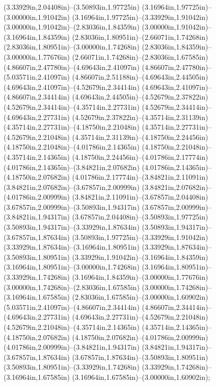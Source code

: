 (3.33929in,2.04408in)--(3.50893in,1.97725in) (3.16964in,1.97725in)--(3.00000in,1.91042in) (3.16964in,1.97725in)--(3.33929in,1.91042in) (3.00000in,1.91042in)--(2.83036in,1.84359in) (3.00000in,1.91042in)--(3.16964in,1.84359in) (2.83036in,1.80951in)--(2.66071in,1.74268in) (2.83036in,1.80951in)--(3.00000in,1.74268in) (2.83036in,1.84359in)--(3.00000in,1.77676in) (2.66071in,1.74268in)--(2.83036in,1.67585in) (4.86607in,2.47780in)--(4.69643in,2.41097in) (4.86607in,2.47780in)--(5.03571in,2.41097in) (4.86607in,2.51188in)--(4.69643in,2.44505in) (4.69643in,2.41097in)--(4.52679in,2.34414in) (4.69643in,2.41097in)--(4.86607in,2.34414in) (4.69643in,2.44505in)--(4.52679in,2.37822in) (4.52679in,2.34414in)--(4.35714in,2.27731in) (4.52679in,2.34414in)--(4.69643in,2.27731in) (4.52679in,2.37822in)--(4.35714in,2.31139in) (4.35714in,2.27731in)--(4.18750in,2.21048in) (4.35714in,2.27731in)--(4.52679in,2.21048in) (4.35714in,2.31139in)--(4.18750in,2.24456in) (4.18750in,2.21048in)--(4.01786in,2.14365in) (4.18750in,2.21048in)--(4.35714in,2.14365in) (4.18750in,2.24456in)--(4.01786in,2.17774in) (4.01786in,2.14365in)--(3.84821in,2.07682in) (4.01786in,2.14365in)--(4.18750in,2.07682in) (4.01786in,2.17774in)--(3.84821in,2.11091in) (3.84821in,2.07682in)--(3.67857in,2.00999in) (3.84821in,2.07682in)--(4.01786in,2.00999in) (3.84821in,2.11091in)--(3.67857in,2.04408in) (3.67857in,2.00999in)--(3.50893in,1.94317in) (3.67857in,2.00999in)--(3.84821in,1.94317in) (3.67857in,2.04408in)--(3.50893in,1.97725in) (3.50893in,1.94317in)--(3.33929in,1.87634in) (3.50893in,1.94317in)--(3.67857in,1.87634in) (3.50893in,1.97725in)--(3.33929in,1.91042in) (3.33929in,1.87634in)--(3.16964in,1.80951in) (3.33929in,1.87634in)--(3.50893in,1.80951in) (3.33929in,1.91042in)--(3.16964in,1.84359in) (3.16964in,1.80951in)--(3.00000in,1.74268in) (3.16964in,1.80951in)--(3.33929in,1.74268in) (3.16964in,1.84359in)--(3.00000in,1.77676in) (3.00000in,1.74268in)--(2.83036in,1.67585in) (3.00000in,1.74268in)--(3.16964in,1.67585in) (2.83036in,1.67585in)--(3.00000in,1.60902in) (5.03571in,2.41097in)--(4.86607in,2.34414in) (4.86607in,2.34414in)--(4.69643in,2.27731in) (4.69643in,2.27731in)--(4.52679in,2.21048in) (4.52679in,2.21048in)--(4.35714in,2.14365in) (4.35714in,2.14365in)--(4.18750in,2.07682in) (4.18750in,2.07682in)--(4.01786in,2.00999in) (4.01786in,2.00999in)--(3.84821in,1.94317in) (3.84821in,1.94317in)--(3.67857in,1.87634in) (3.67857in,1.87634in)--(3.50893in,1.80951in) (3.50893in,1.80951in)--(3.33929in,1.74268in) (3.33929in,1.74268in)--(3.16964in,1.67585in) (3.16964in,1.67585in)--(3.00000in,1.60902in);
